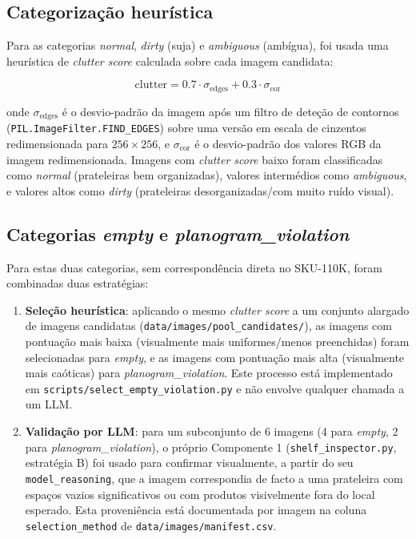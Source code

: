 \documentclass[conference]{IEEEtran}
\begin{document}
\subsection{Categorização heurística}

Para as categorias \textit{normal}, \textit{dirty} (suja) e
\textit{ambiguous} (ambígua), foi usada uma heurística de \textit{clutter
score} calculada sobre cada imagem candidata:

\begin{equation}
\text{clutter} = 0.7 \cdot \sigma_{\text{edges}} + 0.3 \cdot \sigma_{\text{cor}}
\end{equation}

onde $\sigma_{\text{edges}}$ é o desvio-padrão da imagem após um filtro de
deteção de contornos (\texttt{PIL.ImageFilter.FIND\_EDGES}) sobre uma versão
em escala de cinzentos redimensionada para $256\times256$, e
$\sigma_{\text{cor}}$ é o desvio-padrão dos valores RGB da imagem
redimensionada. Imagens com \textit{clutter score} baixo foram classificadas
como \textit{normal} (prateleiras bem organizadas), valores intermédios como
\textit{ambiguous}, e valores altos como \textit{dirty} (prateleiras
desorganizadas/com muito ruído visual).

\subsection{Categorias \textit{empty} e \textit{planogram\_violation}}

Para estas duas categorias, sem correspondência direta no SKU-110K, foram
combinadas duas estratégias:

\begin{enumerate}
  \item \textbf{Seleção heurística}: aplicando o mesmo \textit{clutter
  score} a um conjunto alargado de imagens candidatas
  (\texttt{data/images/pool\_candidates/}), as imagens com pontuação mais
  baixa (visualmente mais uniformes/menos preenchidas) foram selecionadas
  para \textit{empty}, e as imagens com pontuação mais alta (visualmente
  mais caóticas) para \textit{planogram\_violation}. Este processo está
  implementado em \texttt{scripts/select\_empty\_violation.py} e não envolve
  qualquer chamada a um LLM.
  \item \textbf{Validação por LLM}: para um subconjunto de 6 imagens (4 para
  \textit{empty}, 2 para \textit{planogram\_violation}), o próprio
  Componente 1 (\texttt{shelf\_inspector.py}, estratégia B) foi usado para
  confirmar visualmente, a partir do seu \texttt{model\_reasoning}, que a
  imagem correspondia de facto a uma prateleira com espaços vazios
  significativos ou com produtos visivelmente fora do local esperado. Esta
  proveniência está documentada por imagem na coluna
  \texttt{selection\_method} de \texttt{data/images/manifest.csv}.
\end{enumerate}
\end{document}
